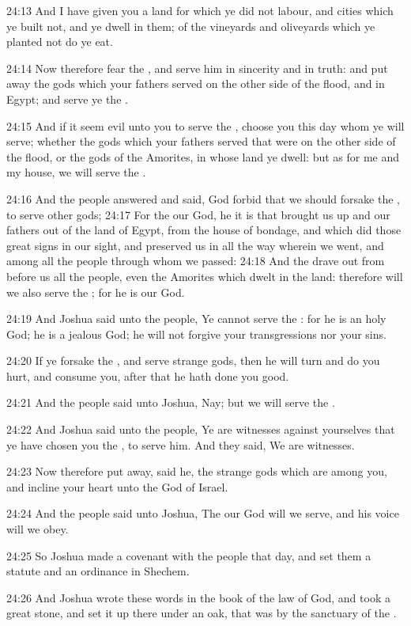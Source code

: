 24:13 And I have given you a land for which ye did not labour, and
cities which ye built not, and ye dwell in them; of the vineyards and
oliveyards which ye planted not do ye eat.

24:14 Now therefore fear the \LORD, and serve him in sincerity and in
truth: and put away the gods which your fathers served on the other
side of the flood, and in Egypt; and serve ye the \LORD.

24:15 And if it seem evil unto you to serve the \LORD, choose you this
day whom ye will serve; whether the gods which your fathers served
that were on the other side of the flood, or the gods of the Amorites,
in whose land ye dwell: but as for me and my house, we will serve the
\LORD.

24:16 And the people answered and said, God forbid that we should
forsake the \LORD, to serve other gods; 24:17 For the \LORD our God, he
it is that brought us up and our fathers out of the land of Egypt,
from the house of bondage, and which did those great signs in our
sight, and preserved us in all the way wherein we went, and among all
the people through whom we passed: 24:18 And the \LORD drave out from
before us all the people, even the Amorites which dwelt in the land:
therefore will we also serve the \LORD; for he is our God.

24:19 And Joshua said unto the people, Ye cannot serve the \LORD: for
he is an holy God; he is a jealous God; he will not forgive your
transgressions nor your sins.

24:20 If ye forsake the \LORD, and serve strange gods, then he will
turn and do you hurt, and consume you, after that he hath done you
good.

24:21 And the people said unto Joshua, Nay; but we will serve the
\LORD.

24:22 And Joshua said unto the people, Ye are witnesses against
yourselves that ye have chosen you the \LORD, to serve him. And they
said, We are witnesses.

24:23 Now therefore put away, said he, the strange gods which are
among you, and incline your heart unto the \LORD God of Israel.

24:24 And the people said unto Joshua, The \LORD our God will we serve,
and his voice will we obey.

24:25 So Joshua made a covenant with the people that day, and set them
a statute and an ordinance in Shechem.

24:26 And Joshua wrote these words in the book of the law of God, and
took a great stone, and set it up there under an oak, that was by the
sanctuary of the \LORD.

